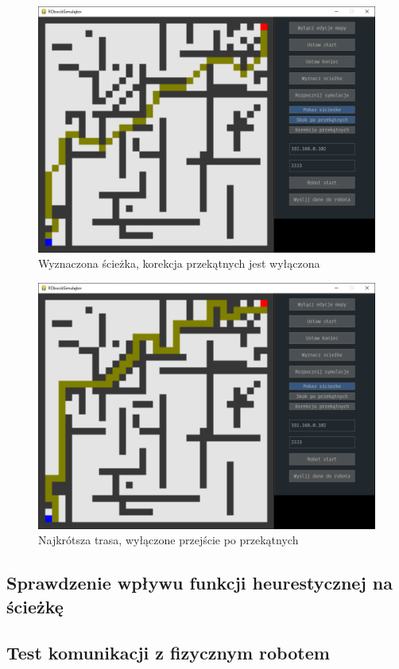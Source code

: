 \begin{figure}[H]
	\centering
	\includegraphics[width=13cm]{pages/testy/zdjecia/t2_2.png}
	\caption{Wyznaczona ścieżka, korekcja przekątnych jest wyłączona}
	\label{Fig:schematSerweraTCP}
\end{figure}


\begin{figure}[H]
	\centering
	\includegraphics[width=13cm]{pages/testy/zdjecia/t2_3.png}
	\caption{Najkrótsza trasa, wyłączone przejście po przekątnych}
	\label{Fig:schematSerweraTCP}
\end{figure}

\subsection{Sprawdzenie wpływu funkcji heurestycznej na ścieżkę}

\subsection{Test komunikacji z fizycznym robotem}

